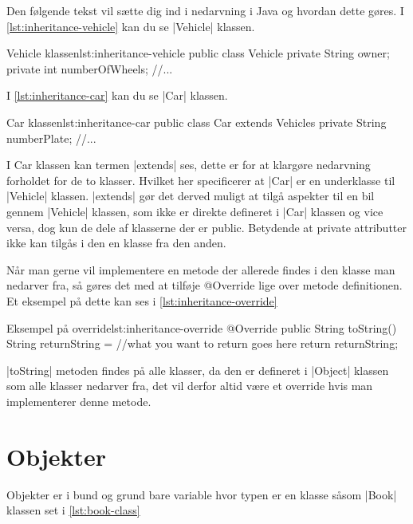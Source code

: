 Den følgende tekst vil sætte dig ind i nedarvning i Java og hvordan dette gøres. I \autoref{lst:inheritance-vehicle} kan du se \JavaInline|Vehicle| klassen.

\begin{JavaCode}{Vehicle klassen}{lst:inheritance-vehicle}
	public class Vehicle
	{
		private String owner;
		private int numberOfWheels;
		//...
	}
\end{JavaCode}
	
I \autoref{lst:inheritance-car} kan du se \JavaInline|Car| klassen.

\begin{JavaCode}{Car klassen}{lst:inheritance-car}
	public class Car extends Vehicles
	{
		private String numberPlate;
		//...
	}
\end{JavaCode}

I Car klassen kan termen \JavaInline|extends| ses, dette er for at klargøre nedarvning forholdet for de to klasser. Hvilket her specificerer at \JavaInline|Car| er en underklasse til \JavaInline|Vehicle| klassen. \JavaInline|extends| gør det derved muligt at tilgå aspekter til en bil gennem \JavaInline|Vehicle| klassen, som ikke er direkte defineret i \JavaInline|Car| klassen og vice versa, dog kun de dele af klasserne der er public. Betydende at private attributter ikke kan tilgås i den en klasse fra den anden.

Når man gerne vil implementere en metode der allerede findes i den klasse man nedarver fra, så gøres det med at tilføje @Override lige over metode definitionen. Et eksempel på dette kan ses i \autoref{lst:inheritance-override}

\begin{JavaCode}{Eksempel på override}{lst:inheritance-override}
	@Override
	public String toString() {
		String returnString = //what you want to return goes here
		return returnString;
	}
\end{JavaCode}

\JavaInline|toString| metoden findes på alle klasser, da den er defineret i \JavaInline|Object| klassen som alle klasser nedarver fra, det vil derfor altid være et override hvis man implementerer denne metode.

\section{Objekter}

Objekter er i bund og grund bare variable hvor typen er en klasse såsom \JavaInline|Book| klassen set i \autoref{lst:book-class}

